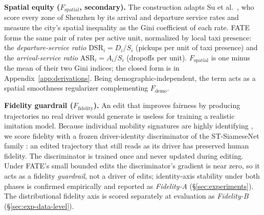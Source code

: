 \textbf{Spatial equity ($F_{\mathrm{spatial}}$, secondary).}
The construction adapts Su et al.~\cite{su2018taxigini}, who score every
zone of Shenzhen by its arrival and departure service rates and measure
the city's spatial inequality as the Gini coefficient of each rate. FATE forms the same pair
of rates per active unit, normalized by local taxi presence: the
\emph{departure-service ratio} $\mathrm{DSR}_i = D_i / S_i$ (pickups per
unit of taxi presence) and the \emph{arrival-service ratio}
$\mathrm{ASR}_i = A_i / S_i$ (dropoffs per unit). $F_{\mathrm{spatial}}$
is one minus the mean of their two Gini indices; the closed form is in
Appendix~\ref{app:derivations}. Being
demographic-independent, the term acts as a spatial smoothness regularizer
complementing $F_{\mathrm{demo}}$.

\textbf{Fidelity guardrail ($F_{\mathrm{fidelity}}$).} An edit that improves
fairness by producing trajectories no real driver would generate is useless
for training a realistic imitation model. Because individual mobility signatures
are highly identifying \cite{gao2017tuler,zhou2018tulvae,miao2020deeptul}, we score
fidelity with a frozen driver-identity discriminator of the ST-SiameseNet
family \cite{ren2020stsiamese}: an edited trajectory that still reads as its
driver has preserved human fidelity. The discriminator is trained once and
never updated during editing. Under FATE's small bounded edits the discriminator's
gradient is near zero, so it acts as a fidelity \emph{guardrail}, not a driver
of edits; identity-axis stability under both phases is confirmed empirically
and reported as \emph{Fidelity-A} (\S\ref{sec:experiments}). The
distributional fidelity axis is scored separately at evaluation as
\emph{Fidelity-B} (\S\ref{sec:exp-data-level}).

